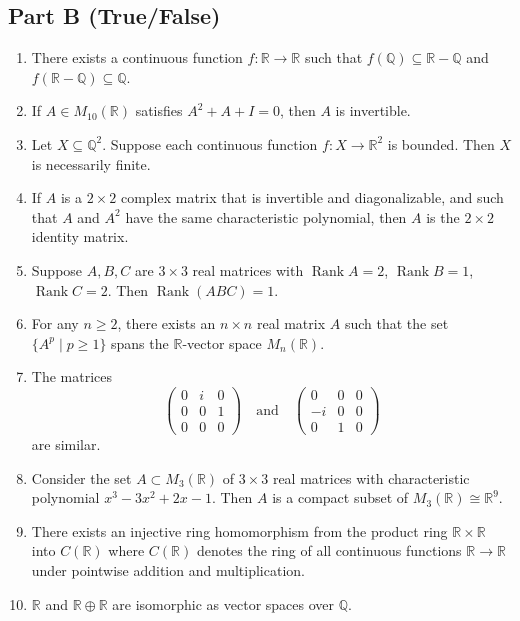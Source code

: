 \documentclass[11pt, a4paper]{article}
\begin{document}
\subsection*{Part B (True/False)}
\begin{enumerate}
  \item There exists a continuous function $f: \mathbb{R} \to \mathbb{R}$ such that $f(\mathbb{Q}) \subseteq \mathbb{R} - \mathbb{Q}$ and $f(\mathbb{R} - \mathbb{Q}) \subseteq \mathbb{Q}$.
  \item If $A \in M_{10}(\mathbb{R})$ satisfies $A^2 + A + I = 0$, then $A$ is invertible.
  \item Let $X \subseteq \mathbb{Q}^2$. Suppose each continuous function $f: X \to \mathbb{R}^2$ is bounded. Then $X$ is necessarily finite.
  \item If $A$ is a $2 \times 2$ complex matrix that is invertible and diagonalizable, and such that $A$ and $A^2$ have the same characteristic polynomial, then $A$ is the $2 \times 2$ identity matrix.
  \item Suppose $A, B, C$ are $3 \times 3$ real matrices with $\operatorname{Rank} A = 2$, $\operatorname{Rank} B = 1$, $\operatorname{Rank} C = 2$. Then $\operatorname{Rank}(ABC) = 1$.
  \item For any $n \ge 2$, there exists an $n \times n$ real matrix $A$ such that the set $\{A^p \mid p \ge 1\}$ spans the $\mathbb{R}$-vector space $M_n(\mathbb{R})$.
  \item The matrices
  \[
    \begin{pmatrix} 0 & i & 0 \\ 0 & 0 & 1 \\ 0 & 0 & 0 \end{pmatrix} \quad \text{and} \quad \begin{pmatrix} 0 & 0 & 0 \\ -i & 0 & 0 \\ 0 & 1 & 0 \end{pmatrix}
  \]
  are similar.
  \item Consider the set $A \subset M_3(\mathbb{R})$ of $3 \times 3$ real matrices with characteristic polynomial $x^3 - 3x^2 + 2x - 1$. Then $A$ is a compact subset of $M_3(\mathbb{R}) \cong \mathbb{R}^9$.
  \item There exists an injective ring homomorphism from the product ring $\mathbb{R} \times \mathbb{R}$ into $C(\mathbb{R})$ where $C(\mathbb{R})$ denotes the ring of all continuous functions $\mathbb{R} \to \mathbb{R}$ under pointwise addition and multiplication.
  \item $\mathbb{R}$ and $\mathbb{R} \oplus \mathbb{R}$ are isomorphic as vector spaces over $\mathbb{Q}$.

\end{enumerate}
\end{document}
